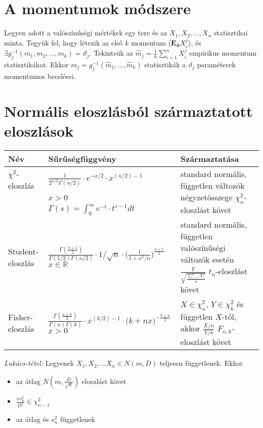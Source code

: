 \section{A momentumok módszere}

Legyen adott a valószínűségi mértékek egy tere és az $X_1, X_2, ..., X_n$ statisztikai minta. Tegyük fel, hogy létezik az első $k$ momentum ($\mathbf{E}_\mathbf{\vartheta}X_i^j$), és $\exists g_j^{-1}(m_1, m_2, ..., m_k) = \vartheta_j$. Tekintsük az $\hat{m}_j=\frac{1}{n}\sum_{i=1}^nX_i^j$ empirikus momentum statisztikákat. Ekkor $m_j = g_j^{-1}(\hat{m}_1,..., \hat{m}_k)$ statisztikák a $\vartheta_j$ paraméterek momentumos becslései.

\section{Normális eloszlásból származtatott eloszlások}

\begin{table}[h]
\centering
\begin{tabular}{|p{2.7cm}|p{5.8cm}|p{5cm}|}
\hline
Név & Sűrűségfüggvény & Származtatása
\\ \hline
$\chi^2$-eloszlás & $ \frac{1}{2^{n/2}\Gamma(n/2)} \cdot e^{-x/2} \cdot x^{(n/2)-1}$ & \multirow{3}{5cm}{standard normális, független változók négyzetösszege $\chi^2_n$-eloszlást követ} \\
&  $ x>0 $ & \\
 & $\Gamma(s) = \int_0^\infty e^{-t} \cdot t^{s-1} dt$ &
\\ \hline
Student-eloszlás & $\frac{\Gamma(\frac{n+1}{2})}{\Gamma(1/2)\Gamma(n/2)} \cdot 1/\sqrt{n} \cdot \Big(\frac{1}{1+x^2/n} \Big)^{\frac{n+1}{2}}$ $x \in \mathbb{R}$ & standard normális, független valószínűségi változók esetén $\frac{Y}{\sqrt{\frac{\sum_{i=1}^{n}X_i^2}{n}}}$ $t_n$-eloszlást követ
\\ \hline
Fisher-eloszlás & $\frac{\Gamma(\frac{n+k}{2})}{\Gamma(n)\Gamma(k)} \cdot x^{(k/2)-1} \cdot \Big(k+nx \Big)^{-\frac{k+n}{2}}$ $x > 0$ & $X \in \chi^2_n$, $Y \in \chi^2_k$ és független $X$-től, akkor $\frac{X/n}{Y/k}$ $F_{n,k}$-eloszlást követ
\\ \hline
\end{tabular}
\end{table}

\emph{Lukács-tétel:} Legyenek $X_1, X_2,...X_n \in N(m,D)$ teljesen függetlenek. Ekkor
\begin{itemize}
\item az átlag $N(m,\frac{D}{\sqrt{n}})$ eloszlást követ
\item $\frac{ns_n^2}{D^2} \in \chi_{n-1}^2$
\item az átlag és $s_n^2$ függetlenek
\end{itemize} 

